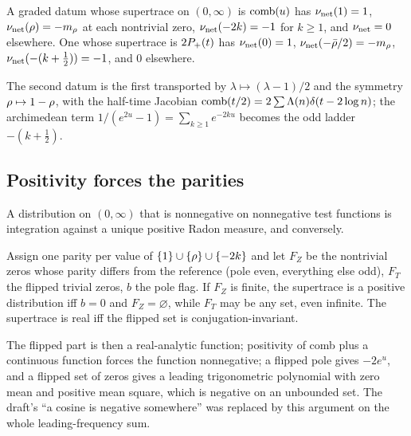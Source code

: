 \begin{corollary}
\label{cor:forced-net-spectrum}
A graded datum whose supertrace on $(0,\infty)$ is $\operatorname{comb}(u)$ has
$\nu_{\mathrm{net}}(1) = 1$, $\nu_{\mathrm{net}}(\rho) = -m_\rho$ at each nontrivial zero, $\nu_{\mathrm{net}}(-2k) =
-1$ for $k\ge1$, and $\nu_{\mathrm{net}} = 0$ elsewhere. One whose supertrace is $2P_{+}(t)$ has
$\nu_{\mathrm{net}}(0) = 1$, $\nu_{\mathrm{net}}(-\bar{\rho}/2) = -m_\rho$, $\nu_{\mathrm{net}}(-(k+\tfrac12)) = -1$, and
$0$ elsewhere.
\end{corollary}

The second datum is the first transported by $\lambda\mapsto(\lambda-1)/2$ and the
symmetry $\rho\mapsto1-\rho$, with the half-time Jacobian $\operatorname{comb}(t/2) =
2\sum\Lambda(n)\delta(t-2\log n)$; the archimedean term $1/(e^{2u}-1) = \sum_{k\ge1}e^{-2ku}$
becomes the odd ladder $-(k+\tfrac12)$.

\subsection{Positivity forces the parities}

\begin{assumption}
\label{asm:positive-distributions}
A distribution on $(0,\infty)$ that is nonnegative on nonnegative test functions is
integration against a unique positive Radon measure, and conversely.
\end{assumption}

\begin{theorem}
\label{thm:parity-forced-finite}
Assign one parity per value of $\{1\}\cup\{\rho\}\cup\{-2k\}$ and let $F_Z$ be the
nontrivial zeros whose parity differs from the reference (pole even, everything else odd),
$F_T$ the flipped trivial zeros, $b$ the pole flag. If $F_Z$ is finite, the supertrace is a
positive distribution iff $b=0$ and $F_Z=\varnothing$, while $F_T$ may be any set, even
infinite. The supertrace is real iff the flipped set is conjugation-invariant.
\end{theorem}

The flipped part is then a real-analytic function; positivity of comb plus a continuous
function forces the function nonnegative; a flipped pole gives $-2e^u$, and a flipped set
of zeros gives a leading trigonometric polynomial with zero mean and positive mean square,
which is negative on an unbounded set. The draft's ``a cosine is negative somewhere'' was
replaced by this argument on the whole leading-frequency sum.

